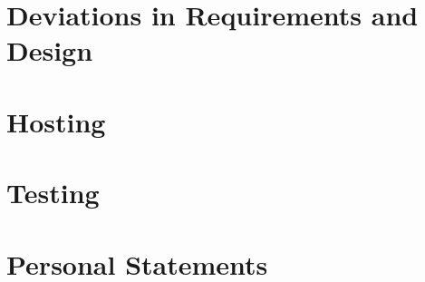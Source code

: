 \chapter{Deviations in Requirements and Design}


\chapter{Hosting}


\chapter{Testing}


\chapter{Personal Statements}

